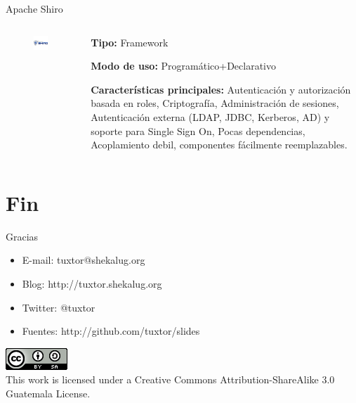 \documentclass[12pt]{beamer}
\begin{document}
\begin{frame}{Apache Shiro}
  \begin{columns}
      \begin{column}{.5\linewidth}
  	    \begin{figure}
  	    \centering
  	    \includegraphics[width=0.6\linewidth]{Images/shiro.jpg}
  	    \end{figure}
      \end{column}
    \begin{column}{.5\linewidth}
\textbf{Tipo:} Framework

\textbf{Modo de uso:} Programático+Declarativo

\textbf{Características principales:}
Autenticación y autorización basada en roles,
Criptografía,
Administración de sesiones,
Autenticación externa (LDAP, JDBC, Kerberos, AD) y soporte para Single Sign On,
Pocas dependencias,
Acoplamiento debil, componentes fácilmente reemplazables.
    \end{column}

  \end{columns}
\end{frame}

\section{Fin}

\begin{frame}{Gracias}
\begin{itemize}
\item E-mail: tuxtor@shekalug.org
\item Blog: http://tuxtor.shekalug.org
\item Twitter: @tuxtor
\item Fuentes: http://github.com/tuxtor/slides
\end{itemize}
\begin{center}
\includegraphics[width=0.1\linewidth]{Images/cclogo}
\\
This work is licensed under a Creative Commons Attribution-ShareAlike 3.0 Guatemala License.
\end{center}
\end{frame}
\end{document}
